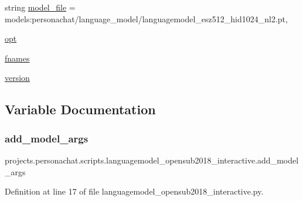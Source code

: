 \begin{DoxyCompactItemize}
\item 
string \hyperlink{namespaceprojects_1_1personachat_1_1scripts_1_1languagemodel__opensub2018__interactive_abc7d67c5b0e306d084c66e3a9e62c074}{model\+\_\+file} = \textquotesingle{}models\+:personachat/language\+\_\+model/languagemodel\+\_\+esz512\+\_\+hid1024\+\_\+nl2.\+pt\textquotesingle{},
\item 
\hyperlink{namespaceprojects_1_1personachat_1_1scripts_1_1languagemodel__opensub2018__interactive_a3059bb9bb5a74dff0d505cd53140a28e}{opt}
\item 
\hyperlink{namespaceprojects_1_1personachat_1_1scripts_1_1languagemodel__opensub2018__interactive_a8a29104ceaca14ed17ab45bab673747f}{fnames}
\item 
\hyperlink{namespaceprojects_1_1personachat_1_1scripts_1_1languagemodel__opensub2018__interactive_ac0f798cd57de4f16baadcc1d28678d3b}{version}
\end{DoxyCompactItemize}


\subsection{Variable Documentation}
\mbox{\label{namespaceprojects_1_1personachat_1_1scripts_1_1languagemodel__opensub2018__interactive_ad88a5bed4198d710b0da31a97edb10af}} 
\subsubsection{\texorpdfstring{add\+\_\+model\+\_\+args}{add\_model\_args}}
{\footnotesize\ttfamily projects.\+personachat.\+scripts.\+languagemodel\+\_\+opensub2018\+\_\+interactive.\+add\+\_\+model\+\_\+args}



Definition at line 17 of file languagemodel\+\_\+opensub2018\+\_\+interactive.\+py.

\mbox{\label{namespaceprojects_1_1personachat_1_1scripts_1_1languagemodel__opensub2018__interactive_a29f50d0b309eba88012286a072b741a9}} 
